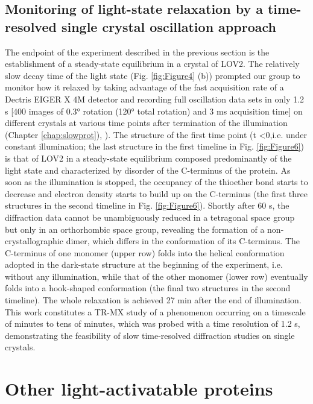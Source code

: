\subsection{Monitoring of light-state relaxation by a time-resolved single crystal oscillation approach}
The endpoint of the experiment described in the previous section is the establishment of a steady-state equilibrium in a crystal of LOV2. The relatively slow decay time of the light state (Fig. \ref{fig:Figure4} (b)) prompted our group  to monitor how it relaxed by taking advantage of the fast acquisition rate of a Dectris EIGER X 4M detector and recording full oscillation data sets in only 1.2 s [400 images of 0.3° rotation (120° total rotation) and 3 ms acquisition time] on different crystals at various time points after termination of the illumination (Chapter \ref{chap:slowprot}), \cite{aumonierSlowProteinDynamics2022}). The structure of the first time point (t <0,i.e. under constant illumination; the last structure in the first timeline in Fig. \ref{fig:Figure6}) is that of LOV2 in a steady-state equilibrium composed predominantly of the light state and characterized by disorder of the C-terminus of the protein. As soon as the illumination is stopped, the occupancy of the thioether bond starts to decrease and electron density starts to build up on the C-terminus (the first three structures in the second timeline in Fig. \ref{fig:Figure6}). Shortly after 60 s, the diffraction data cannot be unambiguously reduced in a tetragonal space group but only in an orthorhombic space group, revealing the formation of a non-crystallographic dimer, which differs in the conformation of its C-terminus. The C-terminus of one monomer (upper row) folds into the helical conformation adopted in the dark-state structure at the beginning of the experiment, i.e. without any illumination, while that of the other monomer (lower row) eventually folds into a hook-shaped conformation (the final two structures in the second timeline). The whole relaxation is achieved 27 min after the end of illumination. This work constitutes a TR-MX study of a phenomenon occurring on a timescale of minutes to tens of minutes, which was probed with a time resolution of 1.2 s, demonstrating the feasibility of slow time-resolved diffraction studies on single crystals.

\section{Other light-activatable proteins}\label{sec:otherlighttrig}

